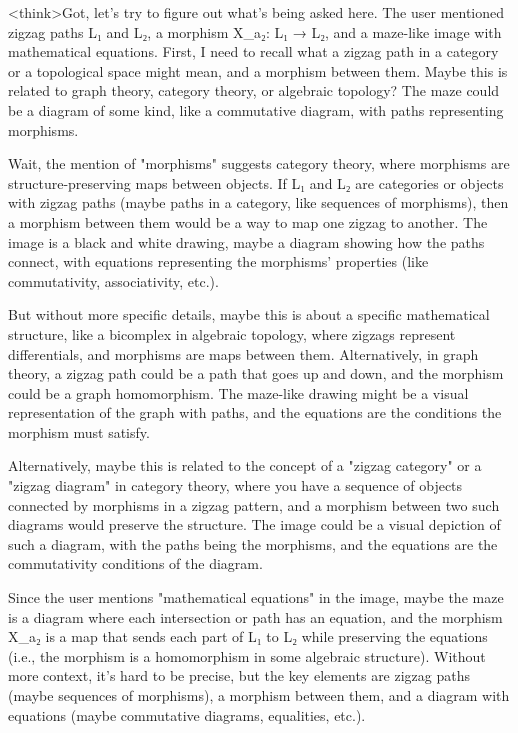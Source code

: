 <think>Got, let's try to figure out what's being asked here. The user mentioned zigzag paths L₁ and L₂, a morphism X_a₂: L₁ → L₂, and a maze-like image with mathematical equations. First, I need to recall what a zigzag path in a category or a topological space might mean, and a morphism between them. Maybe this is related to graph theory, category theory, or algebraic topology? The maze could be a diagram of some kind, like a commutative diagram, with paths representing morphisms.

Wait, the mention of "morphisms" suggests category theory, where morphisms are structure-preserving maps between objects. If L₁ and L₂ are categories or objects with zigzag paths (maybe paths in a category, like sequences of morphisms), then a morphism between them would be a way to map one zigzag to another. The image is a black and white drawing, maybe a diagram showing how the paths connect, with equations representing the morphisms' properties (like commutativity, associativity, etc.).

But without more specific details, maybe this is about a specific mathematical structure, like a bicomplex in algebraic topology, where zigzags represent differentials, and morphisms are maps between them. Alternatively, in graph theory, a zigzag path could be a path that goes up and down, and the morphism could be a graph homomorphism. The maze-like drawing might be a visual representation of the graph with paths, and the equations are the conditions the morphism must satisfy.

Alternatively, maybe this is related to the concept of a "zigzag category" or a "zigzag diagram" in category theory, where you have a sequence of objects connected by morphisms in a zigzag pattern, and a morphism between two such diagrams would preserve the structure. The image could be a visual depiction of such a diagram, with the paths being the morphisms, and the equations are the commutativity conditions of the diagram.

Since the user mentions "mathematical equations" in the image, maybe the maze is a diagram where each intersection or path has an equation, and the morphism X_a₂ is a map that sends each part of L₁ to L₂ while preserving the equations (i.e., the morphism is a homomorphism in some algebraic structure). Without more context, it's hard to be precise, but the key elements are zigzag paths (maybe sequences of morphisms), a morphism between them, and a diagram with equations (maybe commutative diagrams, equalities, etc.).

